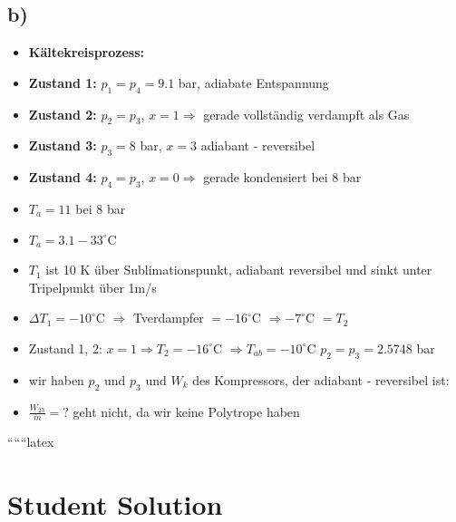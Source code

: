 

\subsection*{b)}

\begin{itemize}
    \item \textbf{Kältekreisprozess:}
    \item \textbf{Zustand 1:} $p_1 = p_4 = 9.1$ bar, adiabate Entspannung
    \item \textbf{Zustand 2:} $p_2 = p_3$, $x = 1 \Rightarrow$ gerade vollständig verdampft als Gas
    \item \textbf{Zustand 3:} $p_3 = 8$ bar, $x = 3$ adiabant - reversibel
    \item \textbf{Zustand 4:} $p_4 = p_3$, $x = 0 \Rightarrow$ gerade kondensiert bei 8 bar
    \item $T_a = 11$ bei 8 bar
    \item $T_a = 3.1 - 33^\circ$C
    \item $T_1$ ist 10 K über Sublimationspunkt, adiabant reversibel und sinkt unter Tripelpunkt über 1m/s
    \item $\Delta T_1 = -10^\circ$C $\Rightarrow$ Tverdampfer $= -16^\circ$C $\Rightarrow -7^\circ$C $= T_2$
    \item Zustand 1, 2: $x = 1 \Rightarrow T_2 = -16^\circ$C $\Rightarrow T_{ab} = -10^\circ$C $p_2 = p_3 = 2.5748$ bar
    \item wir haben $p_2$ und $p_3$ und $W_k$ des Kompressors, der adiabant - reversibel ist:
    \item $\frac{W_{23}}{\dot{m}} = ?$ geht nicht, da wir keine Polytrope haben
\end{itemize}

``````latex


\section*{Student Solution}